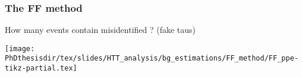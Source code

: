 \begin{frame}
\frametitle{The FF method}

\manip How many events contain misidentified \tauh? (fake taus)

\pause

\begin{center}
\texttt{[image: \\PhDthesisdir/tex/slides/HTT\_analysis/bg\_estimations/FF\_method/FF\_ppe-tikz-partial.tex]}
\end{center}
\end{frame}



%
%
%
%
%
%
